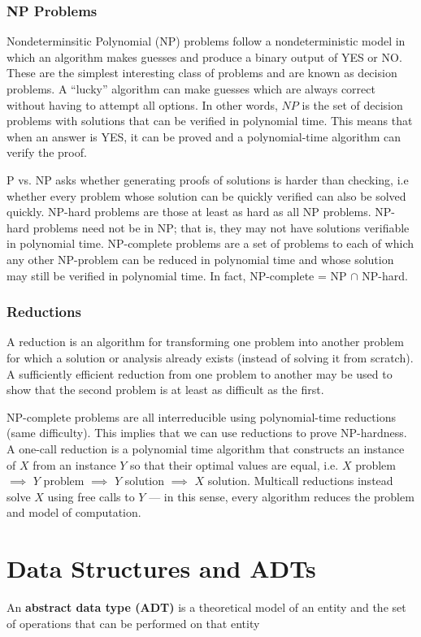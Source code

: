 \documentclass{article}
\begin{document}
\subsubsection{NP Problems}
Nondeterminsitic Polynomial (NP) problems follow a nondeterministic model in which an algorithm makes guesses and produce a binary output of YES or NO. These are the simplest interesting class of problems and are known as decision problems. A ``lucky” algorithm can make guesses which are always correct without having to attempt all options. In other words, $NP$ is the set of decision problems with solutions that can be verified in polynomial time. This means that when an answer is YES, it can be proved and a polynomial-time algorithm can verify the proof.

P vs. NP asks whether generating proofs of solutions is harder than checking, i.e whether every problem whose solution can be quickly verified can also be solved quickly. NP-hard problems are those at least as hard as all NP problems. NP-hard problems need not be in NP; that is, they may not have solutions verifiable in polynomial time. NP-complete problems are a set of problems to each of which any other NP-problem can be reduced in polynomial time and whose solution may still be verified in polynomial time. In fact, NP-complete = NP $\cap$ NP-hard.

\subsubsection{Reductions}
A reduction is an algorithm for transforming one problem into another problem for which a solution or analysis already exists (instead of solving it from scratch). A sufficiently efficient reduction from one problem to another may be used to show that the second problem is at least as difficult as the first. 

NP-complete problems are all interreducible using polynomial-time reductions (same difficulty). This implies that we can use reductions to prove NP-hardness. A one-call reduction is a polynomial time algorithm that constructs an instance of $X$ from an instance $Y$ so that their optimal values are equal, i.e. $X$ problem $\implies$ $Y$ problem $\implies$ $Y$ solution $\implies$ $X$ solution. Multicall reductions instead solve $X$ using free calls to $Y$ — in this sense, every algorithm reduces the problem and model of computation.

\newpage
\section{Data Structures and ADTs}
    An \textbf{abstract data type (ADT)} is a theoretical model of an entity and the set of operations that can be performed on that entity
    
\end{document}
